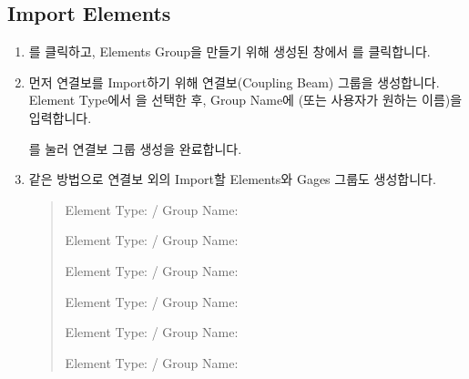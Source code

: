 \documentclass[a4paper,11pt,korean,openany,oneside]{sphinxmanual}
\begin{document}
\newpage


\subsection{Import Elements}
\label{\detokenize{3_import:import-elements}}
\begin{sphinxShadowBox}
\begin{enumerate}
%
\item {} 
\sphinxAtStartPar
{}를 클릭하고, Elements Group을 만들기 위해 생성된 창에서 를 클릭합니다.

\item {} 
\sphinxAtStartPar
먼저 연결보를 Import하기 위해 연결보(Coupling Beam) 그룹을 생성합니다.
Element Type에서 을 선택한 후,
Group Name에 (또는 사용자가 원하는 이름)을 입력합니다.

\begin{center}
\noindent{}
\end{center}

\sphinxAtStartPar
{}를 눌러 연결보 그룹 생성을 완료합니다.

\item {} 
\sphinxAtStartPar
같은 방법으로 연결보 외의 Import할 Elements와 Gages 그룹도 생성합니다.
\begin{quote}\begin{description}
\sphinxAtStartPar
Element Type:  / Group Name: 

\sphinxAtStartPar
Element Type:  / Group Name: 

\sphinxAtStartPar
Element Type:  / Group Name: 

\sphinxAtStartPar
Element Type:  / Group Name: 

\sphinxAtStartPar
Element Type:  / Group Name: 

\sphinxAtStartPar
Element Type:  / Group Name: 


\end{description}
\end{quote}
\end{enumerate}
\end{sphinxShadowBox}
\end{document}
